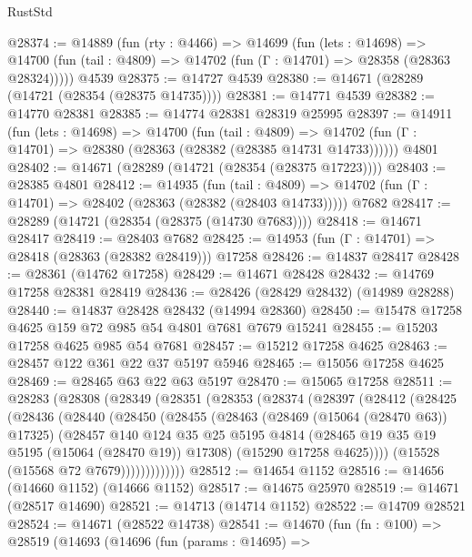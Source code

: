 \begin{lexlean}{RustStd}
\begin{coremodule}
@28374 := @14889
    (fun (rty : @4466) =>
    @14699
      (fun (lets : @14698) =>
      @14700 (fun (tail : @4809) => @14702 (fun (Γ : @14701) => @28358 (@28363 @28324)))))
    @4539
@28375 := @14727 @4539
@28380 := @14671 (@28289 (@14721 (@28354 (@28375 @14735))))
@28381 := @14771 @4539
@28382 := @14770 @28381
@28385 := @14774 @28381 @28319 @25995
@28397 := @14911
    (fun (lets : @14698) =>
    @14700
      (fun (tail : @4809) =>
      @14702 (fun (Γ : @14701) => @28380 (@28363 (@28382 (@28385 @14731 @14733))))))
    @4801
@28402 := @14671 (@28289 (@14721 (@28354 (@28375 @17223))))
@28403 := @28385 @4801
@28412 := @14935
    (fun (tail : @4809) => @14702 (fun (Γ : @14701) => @28402 (@28363 (@28382 (@28403 @14733)))))
    @7682
@28417 := @28289 (@14721 (@28354 (@28375 (@14730 @7683))))
@28418 := @14671 @28417
@28419 := @28403 @7682
@28425 := @14953 (fun (Γ : @14701) => @28418 (@28363 (@28382 @28419))) @17258
@28426 := @14837 @28417
@28428 := @28361 (@14762 @17258)
@28429 := @14671 @28428
@28432 := @14769 @17258 @28381 @28419
@28436 := @28426 (@28429 @28432) (@14989 @28288)
@28440 := @14837 @28428 @28432 (@14994 @28360)
@28450 := @15478 @17258 @4625 @159 @72 @985 @54 @4801 @7681 @7679 @15241
@28455 := @15203 @17258 @4625 @985 @54 @7681
@28457 := @15212 @17258 @4625
@28463 := @28457 @122 @361 @22 @37 @5197 @5946
@28465 := @15056 @17258 @4625
@28469 := @28465 @63 @22 @63 @5197
@28470 := @15065 @17258
@28511 := @28283
    (@28308
      (@28349
        (@28351
          (@28353
            (@28374
              (@28397
                (@28412
                  (@28425
                    (@28436
                      (@28440
                        (@28450
                          (@28455
                            (@28463
                              (@28469 (@15064 (@28470 @63)) @17325)
                              (@28457
                                @140
                                @124
                                @35
                                @25
                                @5195
                                @4814
                                (@28465 @19 @35 @19 @5195 (@15064 (@28470 @19)) @17308)
                                (@15290 @17258 @4625))))
                          (@15528 (@15568 @72 @7679)))))))))))))
@28512 := @14654 @1152
@28516 := @14656 (@14660 @1152) (@14666 @1152)
@28517 := @14675 @25970
@28519 := @14671 (@28517 @14690)
@28521 := @14713 (@14714 @1152)
@28522 := @14709 @28521
@28524 := @14671 (@28522 @14738)
@28541 := @14670
    (fun (fn : @100) =>
    @28519
      (@14693
        (@14696
          (fun (params : @14695) =>

\end{coremodule}
\end{lexlean}
